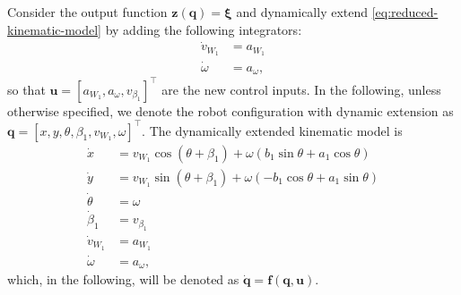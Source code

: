Consider the output function $\bm{z}(\bm{q})=\bm{\xi}$ and dynamically extend
\eqref{eq:reduced-kinematic-model} by adding the following integrators:
\begin{subequations}
    \begin{align*}
        \dot{v}_{W_1} &= a_{W_1} \\
        \dot{\omega} &= a_{\omega},
    \end{align*}
\end{subequations}
so that $\bm{u} = \left[ a_{W_1}, a_{\omega}, v_{\beta_1} \right]^\top $ are
the new control inputs. In the following, unless otherwise specified, we denote
the robot configuration with dynamic extension as
$\bm{q} = [x, y, \theta, \beta_1, v_{W_1}, \omega]^\top$.
The dynamically extended kinematic model is
\begin{equation}
\label{eq:dynamically-extended-kinematic-model}
\begin{split}
    \dot{x} &= v_{W_1} \cos(\theta + \beta_1) + \omega (b_1 \sin\theta + a_1 \cos\theta) \\
    \dot{y} &= v_{W_1} \sin(\theta + \beta_1) + \omega (-b_1 \cos\theta + a_1 \sin\theta) \\
    \dot{\theta} &= \omega \\
    \dot{\beta}_1 &= v_{\beta_1} \\
    \dot{v}_{W_1} &= a_{{W_1}} \\
    \dot{\omega} &= a_{\omega},
\end{split}
\end{equation}
which, in the following, will be denoted as $\dot{\bm{q}} = \bm{f}(\bm{q}, \bm{u})$.

